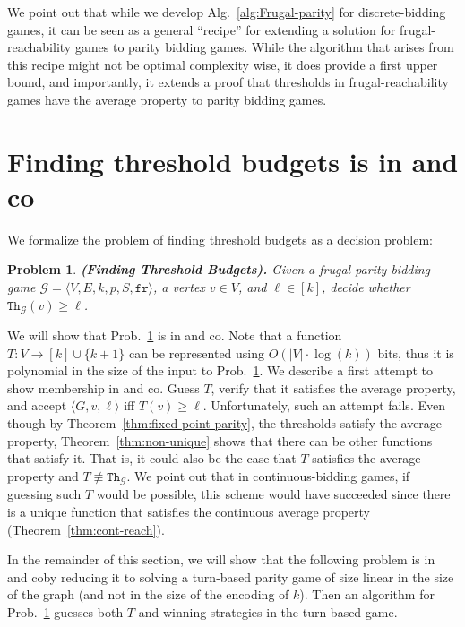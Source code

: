 \documentclass{article}\providecommand{\nequiv}{\not\equiv}\usepackage[a4paper,margin=20mm]{geometry}
\newcommand{\G}{{\mathcal G}}
\newcommand{\fr}{\texttt{fr}}
\newcommand{\thresh}{\texttt{Th}\xspace}
\newcommand{\zug}[1]{\langle #1  \rangle}
\newtheorem{problem}{Problem}
\begin{document}
\begin{remark}
We point out that while we develop Alg.~\ref{alg:Frugal-parity} for discrete-bidding games, it can be seen as a general ``recipe'' for extending a solution for frugal-reachability games to parity bidding games. 
While the algorithm that arises from this recipe might not be optimal complexity wise, it does provide a first upper bound, and importantly, it extends a proof that thresholds in frugal-reachability games have the average property to parity bidding games. 
\end{remark}

\section{Finding threshold budgets is in \NP and co\NP}
\label{sec:NP and coNP}

We formalize the problem of finding threshold budgets as a decision problem: 
\begin{problem}
\label{prob:decision-threshold}
{\bf (Finding Threshold Budgets).}
Given a frugal-parity bidding game $\G = \zug{V, E, k, p, S, \fr}$, a vertex $v \in V$, and $\ell \in [k]$, decide whether $\thresh_\G(v) \geq \ell$.
\end{problem}

We will show that Prob.~\ref{prob:decision-threshold} is in \NP and co\NP. 
Note that a function \(T : V \rightarrow [k] \cup \{k+1\}\) can be represented using $O(|V| \cdot \log(k))$ bits, thus it is polynomial in the size of the input to Prob.~\ref{prob:decision-threshold}. 
We describe a first attempt to show membership in \NP and co\NP. Guess $T$, verify that it satisfies the average property, and accept $\zug{G, v, \ell}$ iff $T(v) \geq \ell$. 
Unfortunately, such an attempt fails. Even though by Theorem~\ref{thm:fixed-point-parity}, the thresholds satisfy the average property, Theorem~\ref{thm:non-unique} shows that there can be other functions that satisfy it. That is, it could also be the case that $T$ satisfies the average property and $T \not \equiv \thresh_\G$. 
We point out that in continuous-bidding games, if guessing such $T$ would be possible, this scheme would have succeeded since there is a unique function that satisfies the continuous average property (Theorem~\ref{thm:cont-reach}). 

In the remainder of this section, we will show that the following problem is in \NP and co\NP by reducing it to solving a turn-based parity game of size linear in the size of the graph (and not in the size of the encoding of \(k\)). 
Then an algorithm for Prob.~\ref{prob:decision-threshold} guesses both \(T\) and winning strategies in the turn-based game. 
\end{document}
